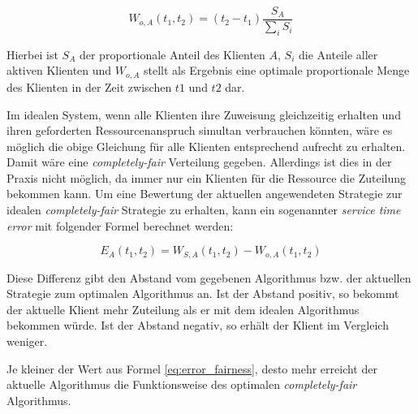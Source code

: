 \begin{equation}
W_{o,A}(t_1,t_2) = (t_2 - t_1) \frac{S_A}{\sum_i S_i}
\label{eq:perfect_fairness}
\end{equation}

Hierbei ist $S_A$ der proportionale Anteil des Klienten $A$, $S_i$ die Anteile aller aktiven Klienten und $W_{o,A}$ stellt als Ergebnis eine optimale proportionale Menge des Klienten in der Zeit zwischen $t1$ und $t2$ dar.

Im idealen System, wenn alle Klienten ihre Zuweisung gleichzeitig erhalten und ihren geforderten Ressourcenanspruch simultan verbrauchen könnten, wäre es möglich die obige Gleichung für alle Klienten entsprechend aufrecht zu erhalten.
Damit wäre eine \textit{completely-fair} Verteilung gegeben. Allerdings ist dies in der Praxis nicht möglich, da immer nur ein Klienten für die Ressource die Zuteilung bekommen kann.
Um eine Bewertung der aktuellen angewendeten Strategie zur idealen \textit{completely-fair} Strategie zu erhalten, kann ein sogenannter \textit{service time error} mit folgender Formel berechnet werden:

\begin{equation}
E_A(t_1,t_2) = W_{S,A}(t_1,t_2) - W_{o,A}(t_1,t_2)
\label{eq:error_fairness}
\end{equation}

Diese Differenz gibt den Abstand vom gegebenen Algorithmus bzw. der aktuellen Strategie zum optimalen Algorithmus an.
Ist der Abstand positiv, so bekommt der aktuelle Klient mehr Zuteilung als er mit dem idealen Algorithmus bekommen würde. Ist der Abstand negativ, so erhält der Klient im Vergleich weniger.

Je kleiner der Wert aus Formel \ref{eq:error_fairness}, desto mehr erreicht der aktuelle Algorithmus die Funktionsweise des optimalen \textit{completely-fair} Algorithmus.
 



